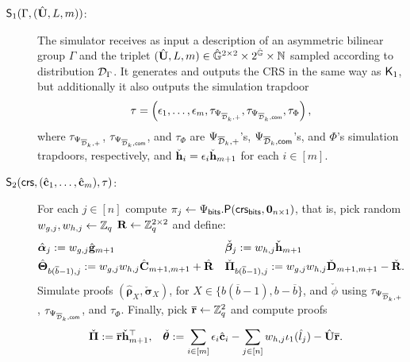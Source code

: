 \begin{description}
	\item[$\mathsf{S}_1(\Gamma,(\hat{\mathbf{{U}}},L,m))$:] The simulator receives as input a description of an asymmetric bilinear group $\Gamma$ and the triplet $(\hat{\mathbf{{U}}},L,m) \in {\ensuremath{\hat{\mathbb{G}}}}^{2 \times 2}\times2^{\hat{\mathbb{G}}}\times\mathbb{N}$ sampled according to distribution $\mathcal{D}_{\Gamma}$. It generates and outputs the CRS in the same way as $\mathsf{K}_1$, but additionally it also  outputs the simulation trapdoor 
	$$\tau=\left(\epsilon_1,\ldots,\epsilon_m, \tau_{\Psi_{\overline{\mathcal{D}}_k,+}}, \tau_{\Psi_{\overline{\mathcal{D}}_k,\mathsf{com}}}, \tau_\Phi\right),$$
	where $\tau_{\Psi_{\overline{\mathcal{D}}_k,+}}$, $\tau_{\Psi_{\overline{\mathcal{D}}_k,\mathsf{com}}}$, and $\tau_\Phi$ are ${\Psi_{\overline{\mathcal{D}}_k,+}}$'s, ${\Psi_{\overline{\mathcal{D}}_k,\mathsf{com}}}$'s, and $\Phi$'s simulation trapdoors, respectively, and
	$\check{\mathbf{h}}_i=\epsilon_i\check{\mathbf{h}}_{m+1}$ for each $i\in[m]$.
	\item[$\mathsf{S}_2(\mathsf{crs},(\hat{\mathbf{c}}_1,\ldots,\hat{\mathbf{c}}_m),\tau)$:] 
	For each $j\in[n]$ compute $\pi_j\gets\Psi_{\mathsf{bits}}.\mathsf{P}(\mathsf{crs}_{\mathsf{bits}},\mathbf{0}_{n\times1})$, that is, pick random $w_{g,j},w_{h,j} \gets \mathbb{Z}_q$  $\mathbf{{R}} \gets \mathbb{Z}_q^{2 \times 2}$ and define:
	\begin{align*}
		&\hat{{\boldsymbol \alpha}}_j := w_{g,j}\hat{\mathbf{g}}_{m+1}& &\check{{\boldsymbol \beta}}_j := w_{h,j}\check{\mathbf{h}}_{m+1}\\
		&{\hat{\mathbf{{\Theta}}}}_{b(\overline{b}-1),j} :=  w_{g,j}w_{h,j}{\hat{\mathbf{{C}}}}_{m+1,m+1}+{\hat{\mathbf{{R}}}}& 
		&\check{\mathbf{{\Pi}}}_{b(\overline{b}-1),j} := w_{g,j}w_{h,j}\check{\mathbf{{D}}}_{m+1,m+1}- \check{\mathbf{{R}}}.
	\end{align*}
	Simulate proofs $(\hat{\boldsymbol \rho}_{X},
	\check{\boldsymbol \sigma}_{X})$,
	for $X \in \{b(\overline{b}-1),  b-\overline{b}\}$, and
	$\check{\phi}$  using $\tau_{\Psi_{\overline{\mathcal{D}}_k,+}}$, $\tau_{\Psi_{\overline{\mathcal{D}}_k,\mathsf{com}}}$, and $\tau_\Phi$.
	Finally, pick $\overline{\mathbf{r}}\gets\mathbb{Z}_q^2$ and compute proofs
	\begin{align*}
		&\check{\mathbf{{\Pi}}}:=\overline{\mathbf{r}}\check{\mathbf{h}}_{m+1}^\top,& &\check{{\boldsymbol \theta}}:=\sum_{i\in[m]}\epsilon_i{\hat{\mathbf{c}}}_i-\sum_{j\in[n]}w_{h,j}\iota_1(\hat{l}_j)-{\hat{\mathbf{{U}}}}\overline{\mathbf{r}}.
	\end{align*}
\end{description}

